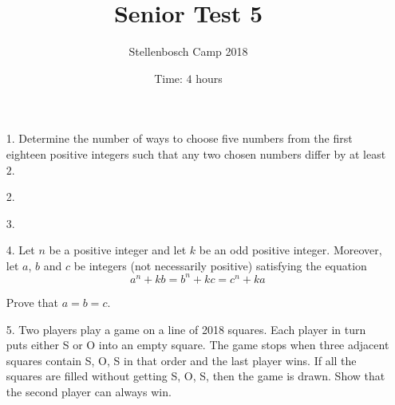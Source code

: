 \documentclass[a4paper, 12pt]{article}
\title{Senior Test 5}
\author{Stellenbosch Camp 2018}
\date{Time: $4$ hours}
\begin{document}
 \maketitle

\begin{enumerate}

\item[1.] Determine the number of ways to choose five numbers from the first eighteen positive integers such that any two chosen numbers differ by at least $2$.


\vspace{6pt}

% 
\item[2.] 


\vspace{6pt}

% 
\item[3.] 


\vspace{6pt}

\item[4.] Let $n$ be a positive integer and let $k$ be an odd positive integer. Moreover, let $a$, $b$ and $c$ be integers (not necessarily positive) satisfying the equation
\begin{equation*}
    a^n + kb = b^n + kc = c^n + ka
\end{equation*}

Prove that $a=b=c$.


\vspace{6pt}

\item[5.]   Two players play a game on a line of 2018 squares. Each player in turn puts either S or O into an empty square. The game stops when three adjacent squares contain S, O, S in that order and the last player wins. If all the squares are filled without getting S, O, S, then the game is drawn. Show that the second player can always win.


\end{enumerate}

\vfill

\centering
\begin{BVerbatim}
\end{BVerbatim}
\end{document}
